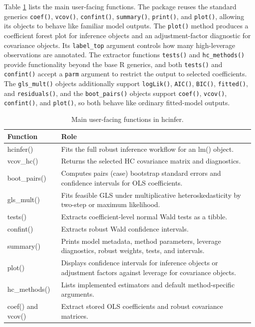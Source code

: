 Table \ref{tab:api} lists the main user-facing functions. The package reuses the standard generics \texttt{coef()}, \texttt{vcov()}, \texttt{confint()}, \texttt{summary()}, \texttt{print()}, and \texttt{plot()}, allowing its objects to behave like familiar model outputs. The \texttt{plot()} method produces a coefficient forest plot for inference objects and an adjustment-factor diagnostic for covariance objects. Its \texttt{label\_top} argument controls how many high-leverage observations are annotated. The extractor functions \texttt{tests()} and \texttt{hc\_methods()} provide functionality beyond the base R generics, and both \texttt{tests()} and \texttt{confint()} accept a \texttt{parm} argument to restrict the output to selected coefficients. The \texttt{gls\_mult()} objects additionally support \texttt{logLik()}, \texttt{AIC()}, \texttt{BIC()}, \texttt{fitted()}, and \texttt{residuals()}, and the \texttt{boot\_pairs()} objects support \texttt{coef()}, \texttt{vcov()}, \texttt{confint()}, and \texttt{plot()}, so both behave like ordinary fitted-model outputs.

\begin{table}

\caption{\label{tab:api}Main user-facing functions in hcinfer.}
\centering
\begin{tabular}[t]{l>{\raggedright\arraybackslash}p{9.8cm}}
\toprule
Function & Role\\
\midrule
hcinfer() & Fits the full robust inference workflow for an lm() object.\\
vcov\_hc() & Returns the selected HC covariance matrix and diagnostics.\\
boot\_pairs() & Computes pairs (case) bootstrap standard errors and confidence intervals for OLS coefficients.\\
gls\_mult() & Fits feasible GLS under multiplicative heteroskedasticity by two-step or maximum likelihood.\\
tests() & Extracts coefficient-level normal Wald tests as a tibble.\\
\addlinespace
confint() & Extracts robust Wald confidence intervals.\\
summary() & Prints model metadata, method parameters, leverage diagnostics, robust weights, tests, and intervals.\\
plot() & Displays confidence intervals for inference objects or adjustment factors against leverage for covariance objects.\\
hc\_methods() & Lists implemented estimators and default method-specific arguments.\\
coef() and vcov() & Extract stored OLS coefficients and robust covariance matrices.\\
\bottomrule
\end{tabular}
\end{table}


